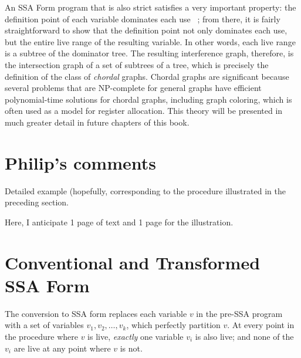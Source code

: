 An SSA Form program that is also strict satisfies a very important
property: the definition point of each variable dominates each use
~\cite{BudimlicJun02}; from there, it is fairly straightforward to
show that the definition point not only dominates each use, but 
the entire live range of the resulting variable. In other words,
each live range is a subtree of the dominator tree. The resulting
interference graph, therefore, is the intersection graph of a set
of subtrees of a tree, which is precisely the definition of the 
class of \emph{chordal} graphs. Chordal graphs are significant because
several problems that are NP-complete for general graphs have efficient
polynomial-time solutions for chordal graphs, including graph coloring,
which is often used as a model for register allocation. This theory
will be presented in much greater detail in future chapters of this book.

\section{Philip's comments}

Detailed example (hopefully, corresponding to
the procedure illustrated in the preceding 
section. 

Here, I anticipate 1 page of text and 1 page
for the illustration.

\section{Conventional and Transformed SSA Form}

The conversion to SSA form replaces each variable $v$ in the pre-SSA
program with a set of variables $v_{1}, v_{2}, \ldots, v_{k}$, which
perfectly partition $v$. At every point in the procedure where $v$ is
live, \emph{exactly} one variable $v_{i}$ is also live; and none of
the $v_{i}$ are live at any point where $v$ is not. 


